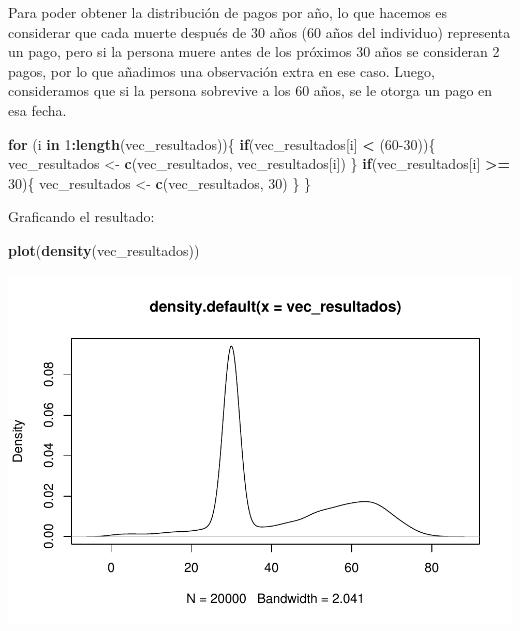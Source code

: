 \documentclass[
]{article}
\newenvironment{Shaded}{\begin{snugshade}}{\end{snugshade}}
\newcommand{\ControlFlowTok}[1]{\textcolor[rgb]{0.13,0.29,0.53}{\textbf{#1}}}
\newcommand{\DecValTok}[1]{\textcolor[rgb]{0.00,0.00,0.81}{#1}}
\newcommand{\FunctionTok}[1]{\textcolor[rgb]{0.13,0.29,0.53}{\textbf{#1}}}
\newcommand{\NormalTok}[1]{#1}
\newcommand{\OtherTok}[1]{\textcolor[rgb]{0.56,0.35,0.01}{#1}}
\newcommand{\SpecialCharTok}[1]{\textcolor[rgb]{0.81,0.36,0.00}{\textbf{#1}}}
\begin{document}
Para poder obtener la distribución de pagos por año, lo que hacemos es
considerar que cada muerte después de 30 años (60 años del individuo)
representa un pago, pero si la persona muere antes de los próximos 30
años se consideran 2 pagos, por lo que añadimos una observación extra en
ese caso. Luego, consideramos que si la persona sobrevive a los 60 años,
se le otorga un pago en esa fecha.

\begin{Shaded}
\begin{Highlighting}[]
\ControlFlowTok{for}\NormalTok{ (i }\ControlFlowTok{in} \DecValTok{1}\SpecialCharTok{:}\FunctionTok{length}\NormalTok{(vec\_resultados))\{}
  \ControlFlowTok{if}\NormalTok{(vec\_resultados[i] }\SpecialCharTok{\textless{}}\NormalTok{ (}\DecValTok{60{-}30}\NormalTok{))\{}
\NormalTok{    vec\_resultados }\OtherTok{\textless{}{-}} \FunctionTok{c}\NormalTok{(vec\_resultados, vec\_resultados[i])}
\NormalTok{  \}}
  \ControlFlowTok{if}\NormalTok{(vec\_resultados[i] }\SpecialCharTok{\textgreater{}=} \DecValTok{30}\NormalTok{)\{}
\NormalTok{    vec\_resultados }\OtherTok{\textless{}{-}} \FunctionTok{c}\NormalTok{(vec\_resultados, }\DecValTok{30}\NormalTok{)}
\NormalTok{  \}}
\NormalTok{\}}
\end{Highlighting}
\end{Shaded}

Graficando el resultado:

\begin{Shaded}
\begin{Highlighting}[]
\FunctionTok{plot}\NormalTok{(}\FunctionTok{density}\NormalTok{(vec\_resultados))}
\end{Highlighting}
\end{Shaded}

\includegraphics{tarea2_files/figure-latex/unnamed-chunk-10-1.pdf}
\end{document}
